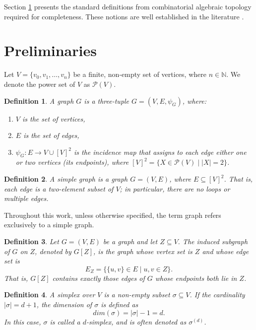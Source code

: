 \documentclass[12pt]{article}
\theoremstyle{normalhead_nobrackets}
\newtheorem{definition}{Definition}[section]
\theoremstyle{exampstyle}
\begin{document}
Section \ref{1sec:preliminaries} presents the standard definitions from combinatorial algebraic topology required for completeness. These notions are well established in the literature \cite{bondy2008graph, hatcher_algebraic_2001, kozlov2008combinatorial, raj2023, raj2024structure}.





\section{Preliminaries}\label{1sec:preliminaries}

Let \( V = \{v_0, v_1, \ldots, v_n\} \) be a finite, non-empty set of vertices, where \( n \in \mathbb{N} \). We denote the power set of $V$ as $\mathcal{P}(V)$.

\begin{definition}
A graph $G$ is a three-tuple \( G = (V, E, \psi_G) \), where:
\begin{enumerate}
    \item[(i)] \( V \) is the set of vertices,
    \item[(ii)] \( E \) is the set of edges,
    \item[(iii)] \( \psi_G : E \rightarrow V \cup [V]^2 \) is the incidence map that assigns to each edge either one or two vertices (its endpoints), where
    \( [V]^2 = \{ X \in \mathcal{P}(V) \mid |X| = 2 \} \).
\end{enumerate}
\end{definition}

\begin{definition}
A simple graph is a graph \( G = (V, E) \), where \( E \subseteq [V]^2 \). That is, each edge is a two-element subset of \(V\); in particular, there are no loops or multiple edges.
\end{definition}


Throughout this work, unless otherwise specified, the term graph refers exclusively to a simple graph.

\begin{definition}
Let $G = (V,E)$ be a graph and let $Z \subseteq V$. 
The induced subgraph of $G$ on $Z$, denoted by $G[Z]$, 
is the graph whose vertex set is $Z$ and whose edge set is
\[
E_Z = \big\{ \{u,v\} \in E \;\big|\; u,v \in Z \big\}.
\]
That is, $G[Z]$ contains exactly those edges of $G$ whose endpoints both lie in $Z$.
\end{definition}


\begin{definition}
A simplex over \( V \) is a non-empty subset \( \sigma \subseteq V \).
If the cardinality \( |\sigma| = d + 1 \), the dimension of \( \sigma \) is defined as
\[
dim(\sigma) = |\sigma| - 1 = d.
\]
In this case, \( \sigma \) is called a \textit{\( d \)-simplex}, and is often denoted as \( \sigma^{(d)} \).
\end{definition}
\end{document}
